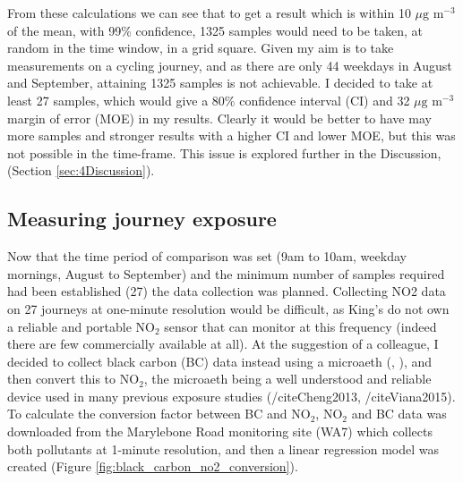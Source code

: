 From these calculations we can see that to get a result which is within 10 $\mu \text{g m}^{-3}$ of the mean, with 99\% confidence, 1325 samples would need to be taken, at random in the time window, in a grid square. Given my aim is to take measurements on a cycling journey, and as there are only 44 weekdays in August and September, attaining 1325 samples is not achievable. I decided to take at least 27 samples, which would give a 80\% confidence interval (CI) and 32 $\mu \text{g m}^{-3}$ margin of error (MOE) in my results. Clearly it would be better to have may more samples and stronger results with a higher CI and lower MOE, but this was not possible in the time-frame. This issue is explored further in the Discussion, (Section \ref{sec:4Discussion}).

\subsection{Measuring journey exposure}
\label{subsec:measuringjourneyexposure}

Now that the time period of comparison was set (9am to 10am, weekday mornings, August to September) and the minimum number of samples required had been established (27) the data collection was planned. Collecting NO2 data on 27 journeys at one-minute resolution would be difficult, as King’s do not own a reliable and portable NO$_{2}$ sensor that can monitor at this frequency (indeed there are few commercially available at all). At the suggestion of a colleague, I decided to collect black carbon (BC) data instead using a microaeth (\cite{Hansen1984}, \cite{Aethlabs2016}), and then convert this to NO$_{2}$, the microaeth being a well understood and reliable device used in many previous exposure studies (/cite{Cheng2013}, /cite{Viana2015}). To calculate the conversion factor between BC and NO$_{2}$, NO$_{2}$ and BC data was downloaded from the Marylebone Road monitoring site (WA7) which collects both pollutants at 1-minute resolution, and then a linear regression model was created (Figure \ref{fig:black_carbon_no2_conversion}). 

